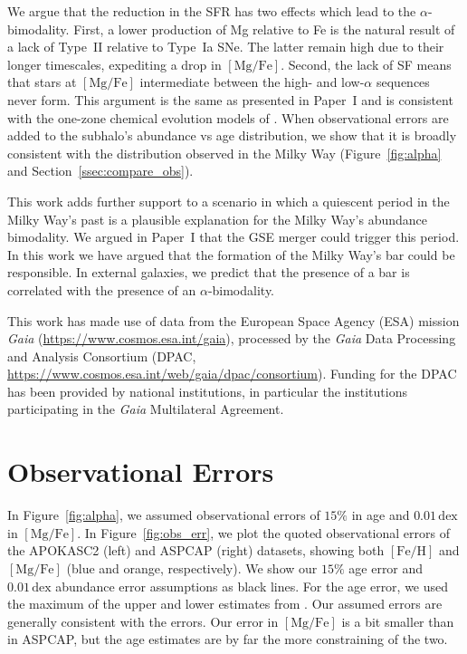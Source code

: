 \documentclass[twocolumn]{aastex631}
\newcommand{\FeH}{\ensuremath{[\textrm{Fe}/\textrm{H}]}}
\newcommand{\MgFe}{\ensuremath{[\textrm{Mg}/\textrm{Fe}]}}
\newcommand{\dex}{\ensuremath{\textrm{dex}}}
\begin{document}
We argue that the reduction in the SFR has two effects which lead to the $\alpha$-bimodality. First, a lower production of Mg relative to Fe is the natural result of a lack of Type~II relative to Type~Ia SNe. The latter remain high due to their longer timescales, expediting a drop in \MgFe{}. Second, the lack of SF means that stars at \MgFe{} intermediate between the high- and low-$\alpha$ sequences never form. This argument is the same as presented in Paper~I and is consistent with the one-zone chemical evolution models of \citet{2020MNRAS.498.1364J}. When observational errors are added to the subhalo's abundance vs age distribution, we show that it is broadly consistent with the distribution observed in the Milky Way (Figure~\ref{fig:alpha} and Section~\ref{ssec:compare_obs}).

This work adds further support to a scenario in which a quiescent period in the Milky Way's past is a plausible explanation for the Milky Way's abundance bimodality. We argued in Paper~I that the GSE merger could trigger this period. In this work we have argued that the formation of the Milky Way's bar could be responsible. In external galaxies, we predict that the presence of a bar is correlated with the presence of an $\alpha$-bimodality.

\begin{acknowledgements}
This work has made use of data from the European Space Agency (ESA) mission {\it Gaia} (\url{https://www.cosmos.esa.int/gaia}), processed by the {\it Gaia} Data Processing and Analysis Consortium (DPAC, \url{https://www.cosmos.esa.int/web/gaia/dpac/consortium}). Funding for the DPAC has been provided by national institutions, in particular the institutions participating in the {\it Gaia} Multilateral Agreement.
\end{acknowledgements}

{}


\appendix

\section{Observational Errors}\label{app:obs_err}
In Figure~\ref{fig:alpha}, we assumed observational errors of $15\%$ in age and $0.01\,\dex$ in \MgFe{}. In Figure~\ref{fig:obs_err}, we plot the quoted observational errors of the APOKASC2 (left) and ASPCAP (right) datasets, showing both \FeH{} and \MgFe{} (blue and orange, respectively). We show our $15\%$ age error and $0.01\,\dex$ abundance error assumptions as black lines. For the age error, we used the maximum of the upper and lower estimates from \citet{2018ApJS..239...32P}. Our assumed errors are generally consistent with the errors. Our error in \MgFe{} is a bit smaller than in ASPCAP, but the age estimates are by far the more constraining of the two.
\end{document}
